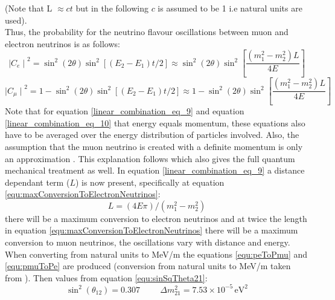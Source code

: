 (Note that L $\approx ct$ but in the following $c$ is assumed to be 1 i.e natural units are used). 
\\Thus, the probability for the neutrino flavour oscillations between muon and electron neutrinos is as follows: 
\begin{equation}
   {\mid{C_e}\mid}^2 = \sin^2(2\theta)\sin^2[(E_2-E_1)t/2] \approx \sin^2(2\theta)\sin^2\left[\frac{(m_1^2-m_2^2)L}{4E}\right]
    \label{linear_combination_eq_9}
\end{equation}
\begin{equation}
    {\mid{C_\mu}\mid}^2 = 1 - \sin^2(2\theta)\sin^2[(E_2-E_1)t/2] \approx 1 - \sin^2(2\theta)\sin^2\left[\frac{(m_1^2-m_2^2)L}{4E}\right]
    \label{linear_combination_eq_10}
\end{equation}
Note that for equation \ref{linear_combination_eq_9} and equation \ref{linear_combination_eq_10} that energy equals momentum, these equations also have to be averaged over the energy distribution of particles involved. Also, the assumption that the muon neutrino is created with a definite momentum is only an approximation \cite{sassaroli1999neutrino}. This explanation follows \cite{sassaroli1999neutrino} which also gives the full quantum mechanical treatment as well. In equation \ref{linear_combination_eq_9} a distance dependant term ($L$) is now present, specifically at equation \ref{equ:maxConversionToElectronNeutrinos}: 
\begin{equation}
    L = (4E\pi) / (m_1^2 - m_2^2)
    \label{equ:maxConversionToElectronNeutrinos}
\end{equation}
there will be a maximum conversion to electron neutrinos and at twice the length in equation \ref{equ:maxConversionToElectronNeutrinos} there will be a maximum conversion to muon neutrinos, the oscillations vary with distance and energy. When converting from natural units to MeV/m the equations \ref{equ:peToPmu} and \ref{equ:pmuToPe} are produced (conversion from natural units to MeV/m taken from \cite{steveBoydLectureNotes}). Then values from equation \ref{equ:sinSqTheta21}: 
\begin{equation}
\sin^2(\theta_{12}) = 0.307\hspace{1cm} \Delta m^2_{21} = 7.53 \times 10^{-5}\,\textrm{eV}^2
\label{equ:sinSqTheta21}
\end{equation}
